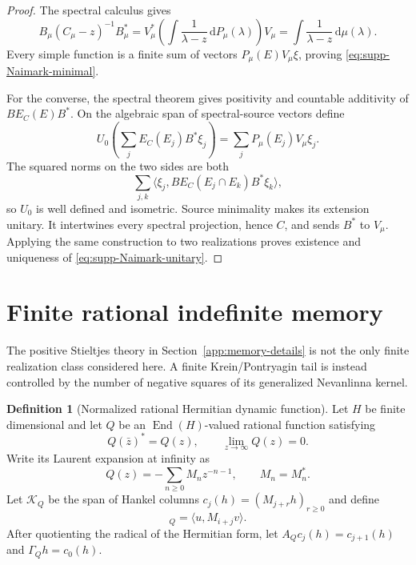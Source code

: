 \documentclass[11pt]{article}
\theoremstyle{definition}
\newtheorem{definition}[definition]{Definition}
\theoremstyle{remark}
\theoremstyle{definition}
\theoremstyle{remark}
\newcommand{\dd}{\mathrm d}
\newcommand{\End}{\operatorname{End}}
\begin{document}
\begin{proof}
The spectral calculus gives
\[
 B_\mu(C_\mu-z)^{-1}B_\mu^*
 =V_\mu^*
 \left(\int\frac{1}{\lambda-z}\,\dd P_\mu(\lambda)\right)V_\mu
 =\int\frac{1}{\lambda-z}\,\dd\mu(\lambda).
\]
Every simple function is a finite sum of vectors
$P_\mu(E)V_\mu\xi$, proving \eqref{eq:supp-Naimark-minimal}.

For the converse, the spectral theorem gives positivity and countable
additivity of $BE_C(E)B^*$.  On the algebraic span of spectral-source vectors
define
\[
 U_0\left(\sum_jE_C(E_j)B^*\xi_j\right)
 =
 \sum_jP_\mu(E_j)V_\mu\xi_j.
\]
The squared norms on the two sides are both
\[
 \sum_{j,k}
 \langle\xi_j,BE_C(E_j\cap E_k)B^*\xi_k\rangle,
\]
so $U_0$ is well defined and isometric.  Source minimality makes its extension
unitary.  It intertwines every spectral projection, hence $C$, and sends
$B^*$ to $V_\mu$.  Applying the same construction to two realizations proves
existence and uniqueness of \eqref{eq:supp-Naimark-unitary}.
\end{proof}

\section{Finite rational indefinite memory}
\label{app:rational-krein}

The positive Stieltjes theory in Section~\ref{app:memory-details} is not
the only finite realization class considered here.  A finite Krein/Pontryagin tail is instead controlled by the number of
negative squares of its generalized Nevanlinna kernel.

\begin{definition}[Normalized rational Hermitian dynamic function]
\label{def:supp-rational-Hermitian}
Let $H$ be finite dimensional and let $Q$ be an $\End(H)$-valued rational function
satisfying
\begin{equation}
Q(\bar z)^*=Q(z),
\qquad
\lim_{z\to\infty}Q(z)=0.
\label{eq:supp-rational-symmetry}
\end{equation}
Write its Laurent expansion at infinity as
\begin{equation}
Q(z)=-\sum_{n\ge0}M_nz^{-n-1},
\qquad M_n=M_n^*.
\label{eq:supp-rational-Laurent}
\end{equation}
Let $\mathcal K_Q$ be the span of Hankel columns
$c_j(h)=(M_{j+r}h)_{r\ge0}$ and define
\begin{equation}
[c_i(u),c_j(v)]_Q=\langle u,M_{i+j}v\rangle.
\label{eq:supp-Hankel-form}
\end{equation}
After quotienting the radical of the Hermitian form, let $A_Qc_j(h)=c_{j+1}(h)$ and
$\Gamma_Qh=c_0(h)$.
\end{definition}
\end{document}
